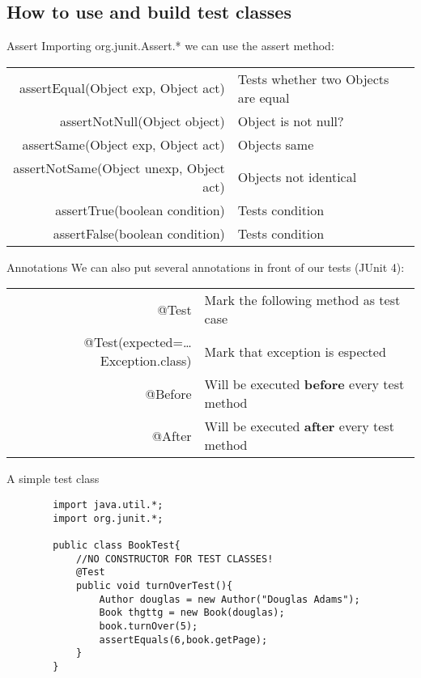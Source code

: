 \subsection{How to use and build test classes}
\begin{frame}{Assert}
	Importing org.junit.Assert.* we can use the assert method:\\
	\vspace{0.25cm}
	\begin{tabular}{rl}
		assertEqual(Object exp, Object act)&Tests whether two Objects are equal\\
		assertNotNull(Object object)&Object is not null?\\
		assertSame(Object exp, Object act)&Objects same\\
		assertNotSame(Object unexp, Object act)&Objects not identical\\
		assertTrue(boolean condition)&Tests condition\\
		assertFalse(boolean condition)&Tests condition\\
	\end{tabular}
\end{frame}

\begin{frame}{Annotations}
	We can also put several annotations in front of our tests (JUnit 4):\\
	\vspace{0.25cm}
	\begin{tabular}{rl}
		@Test&Mark the following method as test case\\
		@Test(expected=\dots Exception.class)&Mark that exception is espected\\
		@Before&Will be executed \textbf{before} every test method\\
		@After&Will be executed \textbf{after} every test method\\
		
	\end{tabular}
\end{frame}


\begin{frame}[fragile]{A simple test class}
	\begin{lstlisting}
		import java.util.*;
		import org.junit.*;
		
		public class BookTest{
			//NO CONSTRUCTOR FOR TEST CLASSES!
			@Test
			public void turnOverTest(){
				Author douglas = new Author("Douglas Adams");
				Book thgttg = new Book(douglas);
				book.turnOver(5);
				assertEquals(6,book.getPage);
			}
		}
	\end{lstlisting}
\end{frame}

